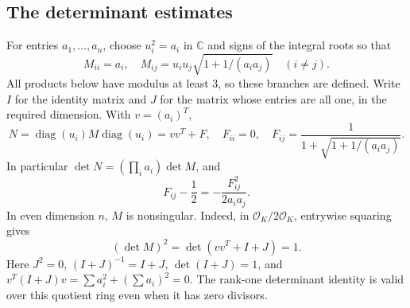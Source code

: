 \documentclass[12pt]{article}
\numberwithin{equation}{section}
\begin{document}
\subsection{The determinant estimates}
For entries \(a_1,\ldots,a_n\), choose \(u_i^2=a_i\) in \(\mathbb C\)
and signs of the integral roots so that
\[
 M_{ii}=a_i,\quad
 M_{ij}=u_i u_j\sqrt{1+1/(a_i a_j)}\quad(i\ne j).
\]
All products below have modulus at least 3, so these branches are defined.
Write $I$ for the identity matrix and $J$ for the matrix whose entries
are all one, in the required dimension. With \(v=(a_i)^T\),
\begin{equation}\label{eq:integrated-1}
N=\operatorname{diag}(u_i)M\operatorname{diag}(u_i)
   =vv^T+F,\quad F_{ii}=0,\quad
 F_{ij}=\frac1{1+\sqrt{1+1/(a_i a_j)}}.
\end{equation}
In particular \(\det N=(\prod_i a_i)\det M\), and
\begin{equation}\label{eq:integrated-2}
F_{ij}-\frac12=-\frac{F_{ij}^2}{2a_i a_j}.
\end{equation}
In even dimension \(n\), \(M\) is nonsingular. Indeed, in
\(\mathcal O_K/2\mathcal O_K\), entrywise squaring gives
\[
 (\det M)^2=\det(vv^T+I+J)=1.
\]
Here \(J^2=0\), \((I+J)^{-1}=I+J\), \(\det(I+J)=1\), and
\(v^T(I+J)v=\sum a_i^2+(\sum a_i)^2=0\). The rank-one determinant
identity is valid over this quotient ring even when it has zero divisors.
\end{document}
